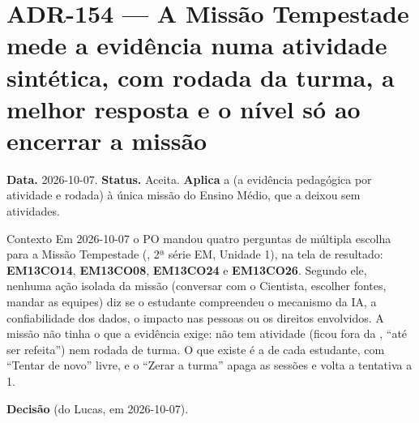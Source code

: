 \section{ADR-154 --- A Missão Tempestade mede a evidência numa atividade sintética, com rodada da turma, a melhor resposta e o nível só ao encerrar a missão}
\label{adr:exp02em1b-evidencia}

\textbf{Data.} 2026-10-07. \textbf{Status.} Aceita. \textbf{Aplica} a
 (a evidência pedagógica por atividade e rodada) à única missão
do Ensino Médio, que a  deixou sem atividades.

\begin{especificacao}{Contexto}
Em 2026-10-07 o PO mandou quatro perguntas de múltipla escolha para a Missão
Tempestade (, 2ª série EM, Unidade 1), na tela de resultado:
\textbf{EM13CO14}, \textbf{EM13CO08}, \textbf{EM13CO24} e \textbf{EM13CO26}.
Segundo ele, nenhuma ação isolada da missão (conversar com o Cientista, escolher
fontes, mandar as equipes) diz se o estudante compreendeu o mecanismo da IA, a
confiabilidade dos dados, o impacto nas pessoas ou os direitos envolvidos. A
missão não tinha o que a evidência exige: não tem atividade (ficou fora da
, \enquote{até ser refeita}) nem rodada de turma. O que existe é a
 de cada estudante, com \enquote{Tentar de novo} livre, e o
\enquote{Zerar a turma} apaga as sessões e volta a tentativa a 1.
\end{especificacao}

\textbf{Decisão} (do Lucas, em 2026-10-07).

